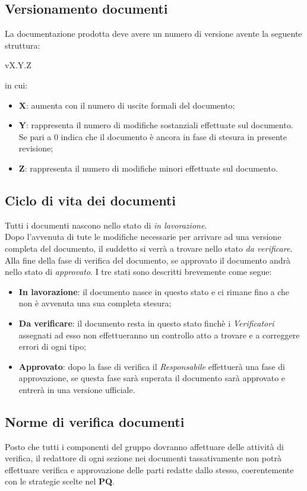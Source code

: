 \documentclass{scalatekids-article}
\begin{document}
\subsection{Versionamento documenti}
La documentazione prodotta deve avere un numero di versione avente la seguente struttura:\\
\begin{center}
  vX.Y.Z
\end{center}
in cui:
\begin{itemize}
\item \textbf{X}: aumenta con il numero di uscite formali del documento;
\item \textbf{Y}: rappresenta il numero di modifiche sostanziali effettuate sul documento. Se pari a 0 indica che il documento è ancora in fase di stesura in presente revisione;
\item \textbf{Z}: rappresenta il numero di modifiche minori effettuate sul documento.
\end{itemize}

\subsection{Ciclo di vita dei documenti}
Tutti i documenti nascono nello stato di \textit{in lavorazione}.\\
Dopo l'avvenuta di tute le modifiche necessarie per arrivare ad una versione completa del documento, il suddetto si verrà a trovare nello stato \textit{da verificare}.\\
Alla fine della fase di verifica del documento, se approvato il documento andrà nello stato di \textit{approvato}.
I tre stati sono descritti brevemente come segue:
\begin{itemize}
\item \textbf{In lavorazione}: il documento nasce in questo stato e ci rimane fino a che non è avvenuta una sua completa stesura;
\item \textbf{Da verificare}: il documento resta in questo stato finchè i \textit{Verificatori} assegnati ad esso non effettueranno un controllo atto a trovare e a correggere errori di ogni tipo;
\item \textbf{Approvato}: dopo la fase di verifica il \textit{Responsabile} effettuerà una fase di approvazione, se questa fase sarà superata il documento sarà approvato e entrerà in una versione ufficiale.
\end{itemize}

\subsection{Norme di verifica documenti}
Posto che tutti i componenti del gruppo dovranno affettuare delle attività di
verifica, il redattore di ogni sezione nei documenti tassativamente non potrà
effettuare verifica e approvazione delle parti redatte dallo stesso,
coerentemente con le strategie scelte nel \textbf{PQ}.
\end{document}
